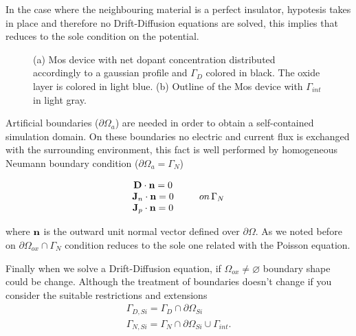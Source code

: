 In the case where the neighbouring material is a perfect insulator, hypotesis  takes in place and therefore no Drift-Diffusion equations are solved, this implies that  reduces to the sole condition on the potential.

\begin{figure}[!b]
\centering
{}
\caption{(a) Mos device with net dopant concentration distributed accordingly to a gaussian profile and $\Gamma_D$ colored in black. The oxide layer is colored in light blue. (b) Outline of the Mos device with $\Gamma_{int}$ in light gray. }
\end{figure}

Artificial boundaries ($\partial \Omega_a$) are needed in order to obtain a self-contained simulation domain.  On these boundaries no electric and current flux is exchanged with the surrounding environment, this fact is well performed by homogeneous Neumann boundary condition ($\partial \Omega_a = \Gamma_N$)

\begin{equation}
\label{eq: neumann boundar condition}
\begin{array}{cc}
\vect{D}\cdot \vect{n} = 0 & \\
\vect{J}_n \cdot \vect{n} = 0 & \psp{10} on \, \Gamma_N \\
\vect{J}_p \cdot \vect{n} = 0 & 
\end{array}
\end{equation}

where $\mathbf{n}$ is the outward unit normal vector defined over $\partial \Omega$. 
As we noted before on $\partial \Omega_{ox} \cap \Gamma_N$ condition  reduces to the sole one related with the Poisson equation.

Finally when we solve a Drift-Diffusion equation, if $\Omega_{ox} \neq \varnothing$ boundary shape could be change. Although the treatment of boundaries doesn't change if you consider the suitable restrictions and extensions
\begin{equation}
\begin{array}{c}
\Gamma_{D,Si} = \Gamma_D \cap \partial \Omega_{Si} \\
\Gamma_{N,Si} = \Gamma_N \cap \partial \Omega_{Si} \cup \Gamma_{int}.
\end{array}
\end{equation}

